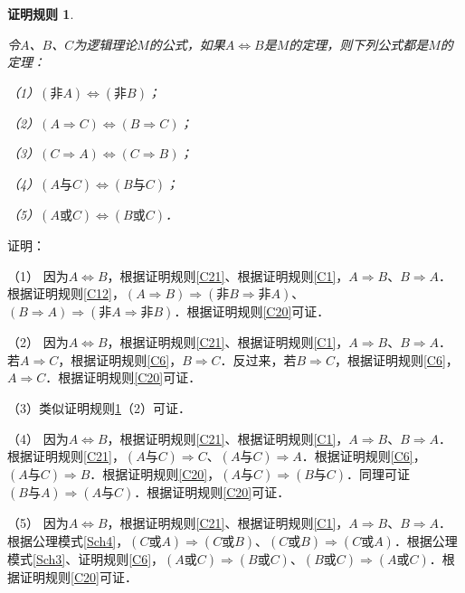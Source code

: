 \documentclass[12pt, a4paper, oneside]{book}
\newtheorem{C}{证明规则}
\begin{document}
			\begin{C}\label{C23}
				\hfill\par
				令$A$、$B$、$C$为逻辑理论$M$的公式，如果$A\Leftrightarrow B$是$M$的定理，则下列公式都是$M$的定理：
				\par
				（1）$(\text{非}A)\Leftrightarrow (\text{非}B)$；
				\par
				（2）$(A\Rightarrow C)\Leftrightarrow (B\Rightarrow C)$；
				\par
				（3）$(C\Rightarrow A)\Leftrightarrow (C\Rightarrow B)$；
				\par
				（4）$(A\text{与}C)\Leftrightarrow (B\text{与}C)$；
				\par
				（5）$(A\text{或}C)\Leftrightarrow (B\text{或}C)$．
			\end{C}
			证明：
			\par
			（1）	因为$A\Leftrightarrow B$，根据证明规则\ref{C21}、根据证明规则\ref{C1}，$A\Rightarrow B$、$B\Rightarrow A$．根据证明规则\ref{C12}，$(A\Rightarrow B)\Rightarrow (\text{非}B\Rightarrow \text{非}A)$、$(B\Rightarrow A)\Rightarrow (\text{非}A\Rightarrow \text{非}B)$．根据证明规则\ref{C20}可证．
			\par
			（2）	因为$A\Leftrightarrow B$，根据证明规则\ref{C21}、根据证明规则\ref{C1}，$A\Rightarrow B$、$B\Rightarrow A$．若$A\Rightarrow C$，根据证明规则\ref{C6}，$B\Rightarrow C$．反过来，若$B\Rightarrow C$，根据证明规则\ref{C6}，$A\Rightarrow C$．根据证明规则\ref{C20}可证．
			\par			
			（3）类似证明规则\ref{C23}（2）可证．
			\par
			（4）	因为$A\Leftrightarrow B$，根据证明规则\ref{C21}、根据证明规则\ref{C1}，$A\Rightarrow B$、$B\Rightarrow A$．根据证明规则\ref{C21}，$(A\text{与}C)\Rightarrow C$、$(A\text{与}C)\Rightarrow A$．根据证明规则\ref{C6}，$(A\text{与}C)\Rightarrow B$．根据证明规则\ref{C20}，$(A\text{与}C)\Rightarrow (B\text{与}C)$．同理可证$(B\text{与}A)\Rightarrow (A\text{与}C)$．根据证明规则\ref{C20}可证．
			\par
			（5）	因为$A\Leftrightarrow B$，根据证明规则\ref{C21}、根据证明规则\ref{C1}，$A\Rightarrow B$、$B\Rightarrow A$．根据公理模式\ref{Sch4}，$(C\text{或}A)\Rightarrow (C\text{或}B)$、$(C\text{或}B)\Rightarrow (C\text{或}A)$．根据公理模式\ref{Sch3}、证明规则\ref{C6}，$(A\text{或}C)\Rightarrow (B\text{或}C)$、$(B\text{或}C)\Rightarrow (A\text{或}C)$．根据证明规则\ref{C20}可证．
\end{document}
